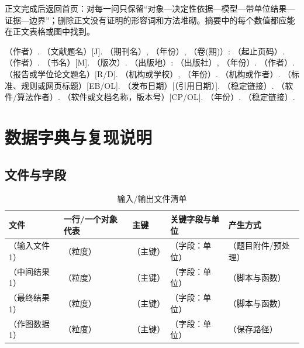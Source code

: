 \documentclass[UTF8,zihao=-4]{ctexart}
\newcommand{\fillin}[1]{（#1）}
\begin{document}
正文完成后返回首页：对每一问只保留“对象—决定性依据—模型—带单位结果—证据—边界”；删除正文没有证明的形容词和方法堆砌。摘要中的每个数值都应能在正文表格或图中找到。

\label{main-body-end}

\clearpage
\begin{thebibliography}{99}
   \fillin{作者}. \fillin{文献题名}[J]. \fillin{期刊名}, \fillin{年份}, \fillin{卷(期)}: \fillin{起止页码}.
   \fillin{作者}. \fillin{书名}[M]. \fillin{版次}. \fillin{出版地}: \fillin{出版社}, \fillin{年份}.
   \fillin{作者}. \fillin{报告或学位论文题名}[R/D]. \fillin{机构或学校}, \fillin{年份}.
   \fillin{机构或作者}. \fillin{标准、规则或网页标题}[EB/OL]. \fillin{发布日期}[\fillin{引用日期}]. \fillin{稳定链接}.
   \fillin{软件/算法作者}. \fillin{软件或文档名称，版本号}[CP/OL]. \fillin{年份}. \fillin{稳定链接}.
\end{thebibliography}

\clearpage
\appendix

\section{数据字典与复现说明}

\subsection{文件与字段}

\begin{table}[htbp]
  \centering
  \caption{输入/输出文件清单}
  \small
  \begin{tabularx}{0.94\textwidth}{YLLLY}
    \toprule
    文件 & 一行/一个对象代表 & 主键 & 关键字段与单位 & 产生方式 \\
    \midrule
    \fillin{输入文件1} & \fillin{粒度} & \fillin{主键} & \fillin{字段：单位} & \fillin{题目附件/预处理} \\
    \fillin{中间结果1} & \fillin{粒度} & \fillin{主键} & \fillin{字段：单位} & \fillin{脚本与函数} \\
    \fillin{最终结果1} & \fillin{粒度} & \fillin{主键} & \fillin{字段：单位} & \fillin{脚本与函数} \\
    \fillin{作图数据1} & \fillin{粒度} & \fillin{主键} & \fillin{字段：单位} & \fillin{保存路径} \\
    \bottomrule
  \end{tabularx}
\end{table}
\end{document}
